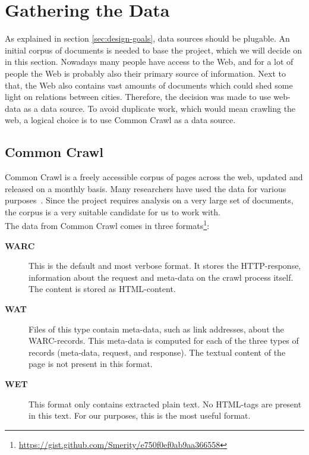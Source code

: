 \section{Gathering the Data}\label{sec:4-gathering}
As explained in section \ref{sec:design-goals}, data sources should be plugable. An initial corpus of documents is needed to base the project, which we will decide on in this section. Nowadays many people have access to the Web, and for a lot of people the Web is probably also their primary source of information. Next to that, the Web also contains vast amounts of documents which could shed some light on relations between cities. Therefore, the decision was made to use web-data as a data source. To avoid duplicate work, which would mean crawling the web, a logical choice is to use Common Crawl as a data source.

\subsection{Common Crawl} \label{sec:commoncrawl}
Common Crawl \cite{commoncrawl} is a freely accessible corpus of pages across the web, updated and released on a monthly basis. Many researchers have used the data for various purposes~\cite{smith2013dirt, muhleisen2012web, singh2012wikilinks}. Since the project requires analysis on a very large set of documents, the corpus is a very suitable candidate for us to work with. \\

The data from Common Crawl comes in three    formats\footnote{\url{https://gist.github.com/Smerity/e750f0ef0ab9aa366558}}: 
\begin{description}
\item[\textbf{WARC}] This is the default and most verbose format. It stores the HTTP-response, information about the request and meta-data on the crawl process itself. The content is stored as HTML-content.
\item[\textbf{WAT}] Files of this type contain meta-data, such as link addresses, about the WARC-records. This meta-data is computed for each of the three types of records (meta-data, request, and response). The textual content of the page is not present in this format.
\item[\textbf{WET}] This format only contains extracted plain text. No HTML-tags are present in this text. For our purposes, this is the most useful format.
\end{description}

